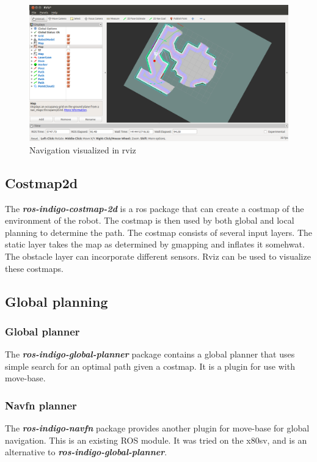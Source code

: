 \documentclass[a4paper]{article}
\newcommand{\rospackage}[1]{\textbf{\textit{ros-indigo-#1}}}
\begin{document}
\begin{figure}[h!]
  \centering
  \includegraphics[width=\textwidth,height=\textheight,keepaspectratio]{img/rviz_navigation2.png}
  \caption{Navigation visualized in rviz}
  \label{fig:navrviz}
\end{figure}

\subsection{Costmap2d}
The \rospackage{costmap-2d} is a ros package that can create a costmap of the environment
of the robot.
The costmap is then used by both global and local planning to determine the path.
The costmap consists of several input layers. The static layer takes the map as determined by
gmapping and inflates it somehwat. The obstacle layer can incorporate different sensors.
Rviz can be used to visualize these costmaps.

\subsection{Global planning}

\subsubsection{Global planner}
The \rospackage{global-planner} package contains a global planner that uses simple search
for an optimal path given a costmap. It is a plugin for use with move-base.

\subsubsection{Navfn planner}
The \rospackage{navfn} package provides another plugin for move-base for global navigation.
This is an existing ROS module. It was tried on the x80sv, and is an alternative to \rospackage{global-planner}.
\end{document}
